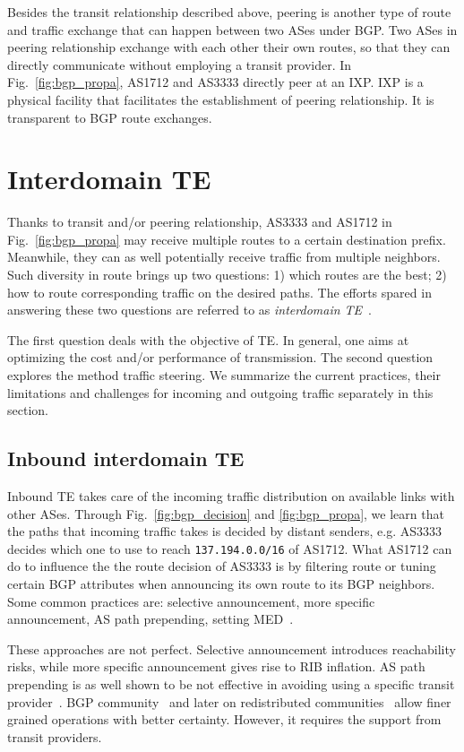 Besides the transit relationship described above, peering is another type of route and traffic exchange that can happen between two ASes under BGP. Two ASes in peering relationship exchange with each other their own routes, so that they can directly communicate without employing a transit provider.
In Fig.~\ref{fig:bgp_propa}, AS1712 and AS3333 directly peer at an \ac{IXP}.
\ac{IXP} is a physical facility that facilitates the establishment of peering relationship. It is transparent to BGP route exchanges.

\section{Interdomain TE}
Thanks to transit and/or peering relationship, AS3333 and AS1712 in Fig.~\ref{fig:bgp_propa} may receive multiple routes to a certain destination prefix. Meanwhile, they can as well potentially receive traffic from multiple neighbors.
Such diversity in route brings up two questions: 1) which routes are the best; 2) how to route corresponding traffic on the desired paths.
The efforts spared in answering these two questions are referred to as \textit{interdomain \ac{TE}}~\cite{Quoitin2004a,Quoitin2003,Feamster2003}.

The first question deals with the objective of \ac{TE}. In general, one aims at optimizing the cost and/or performance of transmission.
The second question explores the method traffic steering.
We summarize the current practices, their limitations and challenges for incoming and outgoing traffic separately in this section.

\subsection{Inbound interdomain TE}
Inbound TE takes care of the incoming traffic distribution on available  links with other ASes.
Through Fig.~\ref{fig:bgp_decision} and \ref{fig:bgp_propa}, we learn that the paths that incoming traffic takes is decided by distant senders, e.g. AS3333 decides which one to use to reach \texttt{137.194.0.0/16} of AS1712.
What AS1712 can do to influence the the route decision of AS3333 is by 
filtering route or tuning certain BGP attributes when announcing its own route to its BGP neighbors.
Some common practices are: selective announcement, more specific announcement, AS path prepending, setting \ac{MED}~\cite{Wang2008}.

These approaches are not perfect. Selective announcement introduces reachability risks, while more specific announcement gives rise to \ac{RIB} inflation. AS path prepending is as well shown to be not effective in avoiding using a specific transit provider~\cite{Quoitin2004a}. BGP community~\cite{Donnet2008, Shao2015} and later on redistributed communities~\cite{Quoitin2002} allow finer grained operations with better certainty. However, it requires the support from transit providers. 

